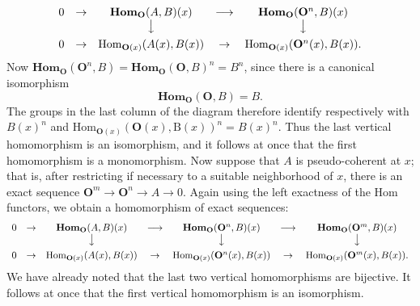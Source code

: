 \clearpage
{}

\[
\begin{array}{ccccc}
0&\to&\mathbf{Hom}_{\mathbf O}(A,B)(x)&\longrightarrow&
  \mathbf{Hom}_{\mathbf O}({\mathbf O}^n,B)(x)\\
&&\big\downarrow&&\big\downarrow\\[0.45em]
0&\to&\mathrm{Hom}_{{\mathbf O}(x)}(A(x),B(x))&\to&
  \mathrm{Hom}_{{\mathbf O}(x)}({\mathbf O}^n(x),B(x)).
\end{array}
\]
Now $\mathbf{Hom}_{\mathbf O}({\mathbf O}^n,B)=\mathbf{Hom}_{\mathbf O}({\mathbf O},B)^n=B^n$, since there is a
canonical isomorphism
\[
\tag{4.1.4}
\mathbf{Hom}_{\mathbf O}({\mathbf O},B)=B.
\]
The groups in the last column of the diagram therefore identify respectively
with $B(x)^n$ and $\mathrm{Hom}_{{\mathbf O}(x)}({\mathbf O}(x),\mathrm B(x))^n=B(x)^n$. Thus the last
vertical homomorphism is an isomorphism, and it follows at once that the first
homomorphism is a monomorphism. Now suppose that $A$ is pseudo-coherent at
$x$; that is, after restricting if necessary to a suitable neighborhood of
$x$, there is an exact sequence
${\mathbf O}^m\to {\mathbf O}^n\to A\to0$. Again using the
left exactness of the $\mathrm{Hom}$ functors, we obtain a homomorphism of
exact sequences:
\[
\begin{array}{ccccccc}
0&\to&\mathbf{Hom}_{\mathbf O}(A,B)(x)&\longrightarrow&
  \mathbf{Hom}_{\mathbf O}({\mathbf O}^n,B)(x)&\longrightarrow&\mathbf{Hom}_{\mathbf O}({\mathbf O}^m,B)(x)\\
&&\big\downarrow&&\big\downarrow&&\big\downarrow\\[0.45em]
0&\to&\mathrm{Hom}_{{\mathbf O}(x)}(A(x),B(x))&\to&
  \mathrm{Hom}_{{\mathbf O}(x)}({\mathbf O}^n(x),B(x))&\to&
  \mathrm{Hom}_{{\mathbf O}(x)}({\mathbf O}^m(x),B(x)).
\end{array}
\]
We have already noted that the last two vertical homomorphisms are bijective.
It follows at once that the first vertical homomorphism is an isomorphism.

